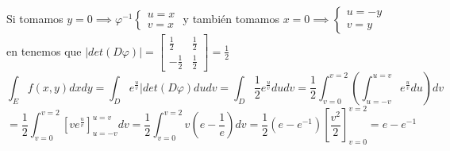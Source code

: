 {\begin{center}
\begin{minipage}{0.45\textwidth}
            \end{minipage}
        \end{center}
    
        Si tomamos $y = 0 \implies \varphi^{-1} \begin{cases} u = x \\ v = x \end{cases}$ y también tomamos $x = 0 \implies \begin{cases} u = -y \\ v = y \end{cases}$\\
        en tenemos que $|det(D\varphi)| = \begin{bmatrix} \frac{1}{2} & \frac{1}{2} \\ -\frac{1}{2} & \frac{1}{2} \end{bmatrix} = \frac{1}{2}$\\
        $$\int_{E}f(x,y)dxdy = \int_D e^{\frac{u}{v}} |det(D\varphi)du dv = \int_D \frac{1}{2} e^{\frac{u}{v}}du dv = \frac{1}{2} \int_{v = 0}^{v = 2}\left(\int_{u = -v}^{u = v}e^{\frac{u}{v}}du\right)dv$$
        $$  = \frac{1}{2} \int_{v = 0}^{v = 2}\left[v e^{\frac{u}{v}}\right] _{u = -v}^{u = v} dv = \frac{1}{2} \int_{v = 0}^{v =2}v(e-\frac{1}{e})dv = \frac{1}{2}(e-e^{-1}) \left[\frac{v^2}{2}\right]_{v = 0}^{v=2} = e - e^{-1}$$
    }
